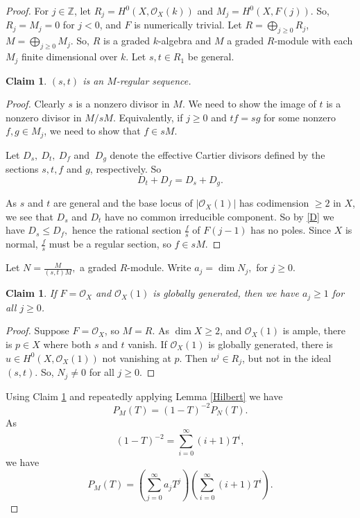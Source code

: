 \documentclass[11pt,letterpaper]{amsart}
\newtheorem{claim}[lemma]{Claim}
\begin{document}
\begin{proof}
For $j\in \mathbb{Z}$, let $R_j=H^0(X,\mathcal{O}_X(k))$ and $M_j=H^0(X,F(j))$. So, $R_j=M_j=0$ for $j<0$, and $F$ is numerically trivial. Let $R=\bigoplus_{j\ge0}R_j$, $M=\bigoplus_{j\ge0}M_j$. So, $R$ is a graded $k$-algebra and $M$ a graded $R$-module with each $M_j$ finite dimensional over $k$. Let $s,t\in R_1$ be general.

\begin{claim}\label{regular sequence}
 $(s,t)$ is an $M$-regular sequence.
\end{claim}
\begin{proof}
Clearly $s$ is a nonzero divisor in $M$. We need to show the image of $t$ is a nonzero divisor in $M/sM$. Equivalently, if $j\geq 0$ and $
tf=sg$
for some nonzero $f,g\in M_j$, we
need to show that $f\in sM$.

Let $D_s,\ D_t,\ D_f$ and $\ D_g$ denote the
effective Cartier divisors defined by the sections $s,t,f$ and $g$,
respectively. So
\begin{equation}\label{D}
D_t+D_f=D_s+D_g.
\end{equation}

 As $s$ and $t$ are general and the base locus of $|\mathcal{O}_X(1)|$ has codimension $\geq 2$ in $X$, we see that
$D_s$ and $D_t$ have no common irreducible component. So by \eqref{D} we have $D_s\le D_f,$
hence the rational section $\frac{f}{s}$
of $F(j-1)$ has no poles. Since $X$ is normal, $
\frac{f}{s}$ must be a regular section,
so $f\in sM$.
\end{proof}
Let $N =\frac{M}{(s,t)M},$
a graded $R$-module. Write $a_j=\dim N_j,$ for $j\ge0.$
\begin{claim}\label{2}
If $F=\mathcal{O}_X$ and $\mathcal{O}_X(1)$ is globally generated, then we have $a_j\ge 1$ for all $j\ge 0$.
\end{claim}
\begin{proof}
Suppose $F=\mathcal{O}_X$, so $M=R$. As $\dim X\ge2$, and $\mathcal{O}_X(1)$ is ample, there is $p\in X$ where both $s$ and $t$
vanish. If $\mathcal{O}_X(1)$ is globally generated, there is $u\in H^0(X,\mathcal{O}_X(1))$ not vanishing at $p$. Then $u^j\in R_j$, but not in the ideal $(s,t)$. So, $N_j\neq 0$ for all $j\geq 0$.
\end{proof}

 Using Claim \ref{regular sequence} and repeatedly applying Lemma \ref{Hilbert}
we have
\[
P_M(T)=(1-T)^{-2}P_N(T).
\]
As
\[
(1-T)^{-2}
=\sum_{i=0}^{\infty}(i+1)T^i,
\]
we have
\begin{equation}\label{P_R}
P_M(T)
=
\left(\sum_{j=0}^{\infty}a_jT^j\right)
\left(\sum_{i=0}^{\infty}(i+1)T^i\right).
\end{equation}


\end{proof}
\end{document}

